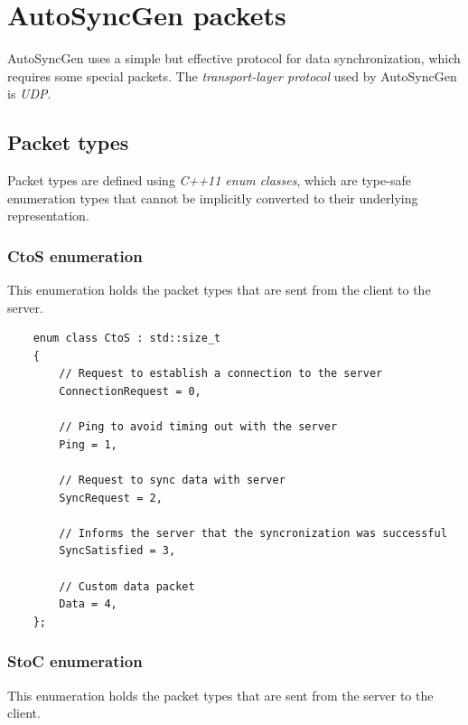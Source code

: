 \documentclass{report}
\def \cppStart {\begin{verbatim}}
\begin{document}
        \section{AutoSyncGen packets}
            
            AutoSyncGen uses a simple but effective protocol for data synchronization, which requires some special packets.
            The \emph{transport-layer protocol} used by AutoSyncGen is \emph{UDP}.

            \subsection{Packet types}
                Packet types are defined using \emph{C++11 enum classes}, which are type-safe enumeration types that cannot be implicitly converted to their underlying representation.

                \subsubsection{CtoS enumeration}
                    This enumeration holds the packet types that are sent from the client to the server.

                    \cppStart
    enum class CtoS : std::size_t
    {
        // Request to establish a connection to the server
        ConnectionRequest = 0,      
        
        // Ping to avoid timing out with the server
        Ping = 1,                   

        // Request to sync data with server
        SyncRequest = 2,            
        
        // Informs the server that the syncronization was successful
        SyncSatisfied = 3,         

        // Custom data packet
        Data = 4,                   
    };
                    \end{verbatim}

                \subsubsection{StoC enumeration}
                    This enumeration holds the packet types that are sent from the server to the client.
\end{document}
